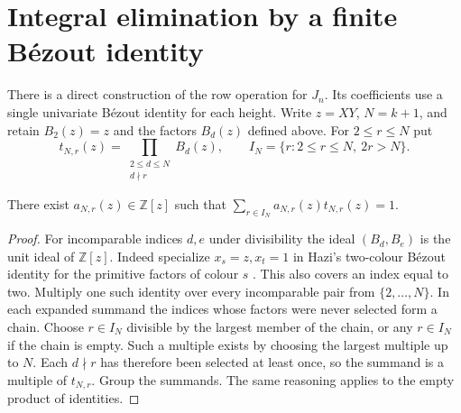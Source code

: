 \section{Integral elimination by a finite B\'ezout identity}
\label{sec:integral-elimination}

There is a direct construction of the row operation for \(J_n\).
Its coefficients use a single univariate B\'ezout identity for each height.
Write \(z=XY\), \(N=k+1\), and retain \(B_2(z)=z\) and the
factors \(B_d(z)\) defined above. For \(2\le r\le N\) put
\[
 t_{N,r}(z)=\prod_{\substack{2\le d\le N\\d\nmid r}}B_d(z),
 \qquad
 I_N=\{r:2\le r\le N,\ 2r>N\}.
\]

\begin{lemma}
There exist \(a_{N,r}(z)\in\mathbb Z[z]\) such that
\(\sum_{r\in I_N}a_{N,r}(z)t_{N,r}(z)=1\).
\end{lemma}
\begin{proof}
For incomparable indices \(d,e\) under divisibility the ideal
\((B_d,B_e)\) is the unit ideal of \(\mathbb Z[z]\).
Indeed specialize \(x_s=z,x_t=1\) in Hazi's
two-colour B\'ezout identity for the primitive factors of colour \(s\)
\cite[Lemma 3.5]{hazi}. This also covers an index equal to two.
Multiply one such identity over every incomparable pair from
\(\{2,\ldots,N\}\). In each expanded summand the indices whose
factors were never selected form a chain. Choose \(r\in I_N\) divisible
by the largest member of the chain, or any \(r\in I_N\) if the chain
is empty. Such a multiple exists by choosing the largest multiple
up to \(N\). Each \(d\nmid r\) has therefore been selected at least
once, so the summand is a multiple of \(t_{N,r}\). Group the summands.
The same reasoning applies to the empty product of identities.
\end{proof}

